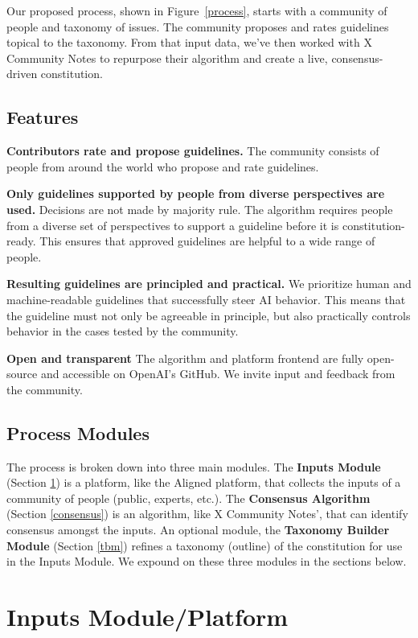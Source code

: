 \documentclass{article}
\begin{document}
\begin{multicols}{2}
Our proposed process, shown in Figure~\ref{process}, starts with a community of people and taxonomy of issues. The community proposes and rates guidelines topical to the taxonomy. From that input data, we’ve then worked with X Community Notes to repurpose their algorithm and create a live, consensus-driven constitution. 

\subsection{Features}

\textbf{Contributors rate and propose guidelines.} The community consists of people from around the world who propose and rate guidelines.

\textbf{Only guidelines supported by people from diverse perspectives are used.} Decisions are not made by majority rule. The algorithm requires people from a diverse set of perspectives to support a guideline before it is constitution-ready. This ensures that approved guidelines are helpful to a wide range of people.

\textbf{Resulting guidelines are principled and practical.} We prioritize human and machine-readable guidelines that successfully steer AI behavior. This means that the guideline must not only be agreeable in principle, but also practically controls behavior in the cases tested by the community. 

\textbf{Open and transparent}
The algorithm and platform frontend are fully open-source and accessible on OpenAI’s GitHub. We invite input and feedback from the community.

\subsection{Process Modules}

The process is broken down into three main modules. The \textbf{Inputs Module} (Section \ref{inputs}) is a platform, like the Aligned platform, that collects the inputs of a community of people (public, experts, etc.). The \textbf{Consensus Algorithm} (Section \ref{consensus}) is an algorithm, like X Community Notes', that can identify consensus amongst the inputs. An optional module, the \textbf{Taxonomy Builder Module} (Section \ref{tbm}) refines a taxonomy (outline) of the constitution for use in the Inputs Module. We expound on these three modules in the sections below.

\section{Inputs Module/Platform} \label{inputs}


\end{multicols}
\end{document}
